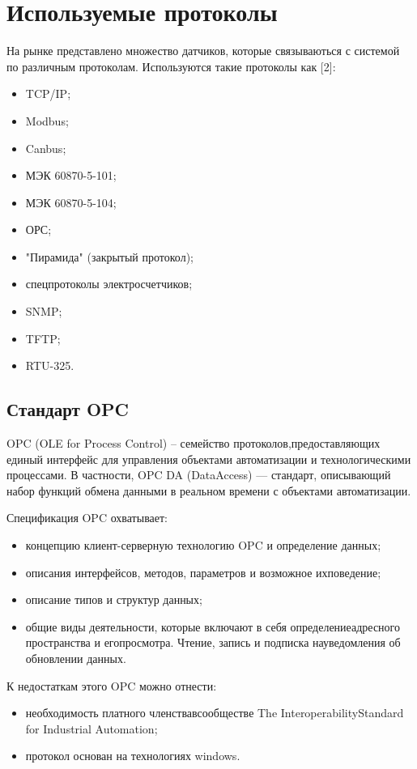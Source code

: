 \section{Используемые протоколы}
\setcounter{figure}{0}

На рынке представлено множество датчиков, которые связываються с системой по различным протоколам. Используются такие протоколы как [2]:
\begin{itemize}
\item TCP/IP;
\item Modbus;
\item Canbus;
\item МЭК 60870-5-101;
\item МЭК 60870-5-104;
\item ОРС;
\item "Пирамида" (закрытый протокол);
\item спецпротоколы электросчетчиков;
\item SNMP;
\item TFTP;
\item RTU-325.
\end{itemize}

\subsection{Стандарт OPC}

OPC (OLE for Process Control) – семейство протоколов,предоставляющих единый интерфейс для управления объектами автоматизации и технологическими процессами. В частности, OPC DA (DataAccess) — стандарт, описывающий набор функций обмена данными в реальном времени с объектами автоматизации. 

Спецификация OPC охватывает:
\begin{itemize}
 \item концепцию клиент-серверную технологию OPC и определение данных;
 \item описания интерфейсов, методов, параметров и возможное ихповедение;
 \item описание типов и структур данных;
 \item общие виды деятельности, которые включают в себя определениеадресного пространства и егопросмотра. Чтение, запись и подписка науведомления об обновлении данных.
\end{itemize}

К недостаткам этого OPC можно отнести:
\begin{itemize}
 \item необходимость платного членствавсообществе The InteroperabilityStandard for Industrial Automation;
 \item протокол основан на технологиях windows.
\end{itemize}


